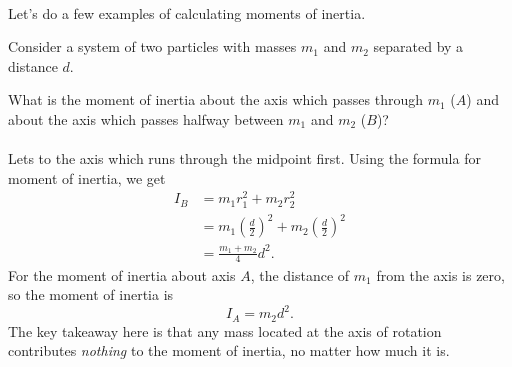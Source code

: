 \documentclass[../classical_mechanics.tex]{subfiles}
\begin{document}
        \paragraph{}
        Let's do a few examples of calculating moments of inertia.
        \begin{example}
            Consider a system of two particles with masses $m_1$ and $m_2$ separated by a distance $d$.
            \begin{figure}[H]
                \centering
            \end{figure}
            What is the moment of inertia about the axis which passes through $m_1$ ($A$) and about the axis which passes halfway between $m_1$ and $m_2$ ($B$)?

            \paragraph{}
            Lets to the axis which runs through the midpoint first.
            Using the formula for moment of inertia, we get
            \begin{align}
                I_B&=m_1r_1^2+m_2r_2^2\\
                &=m_1\left(\frac{d}{2}\right)^2+m_2\left(\frac{d}{2}\right)^2\\
                &=\frac{m_1+m_2}{4}d^2.
            \end{align}
            For the moment of inertia about axis $A$, the distance of $m_1$ from the axis is zero, so the moment of inertia is
            \begin{equation}
                I_A=m_2 d^2.
            \end{equation}
            The key takeaway here is that any mass located at the axis of rotation contributes \textit{nothing} to the moment of inertia, no matter how much it is.
        \end{example}
\end{document}
